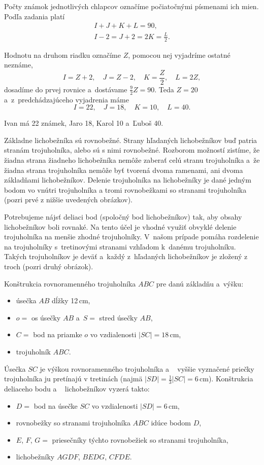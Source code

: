 {%
Počty známok jednotlivých chlapcov označíme počiatočnými písmenami ich mien.
Podľa zadania platí
$$
\begin{gathered}
	I+J+K+L=90, \\
	I-2 =J+2 =2K =\frac{L}2 .
\end{gathered}
$$

Hodnotu na druhom riadku označíme $Z$, pomocou nej vyjadríme ostatné neznáme,
$$
I=Z+2,\quad J=Z-2,\quad K=\frac{Z}2,\quad L=2Z,
$$
dosadíme do prvej rovnice a~dostávame $\frac92 Z=90$.
Teda $Z=20$ a~z~predchádzajúceho vyjadrenia máme
$$
I=22,\quad J=18,\quad K=10,\quad L=40.
$$

Ivan má 22 známek, Jaro 18, Karol 10 a~Ľuboš 40.
}

{%
Základne lichobežníka sú rovnobežné.
Strany hľadaných lichobežníkov buď patria stranám trojuholníka, alebo sú s nimi rovnobežné.
Rozborom možností zistíme, že žiadna strana žiadneho lichobežníka nemôže zaberať celú stranu trojuholníka a~že žiadna strana trojuholníka nemôže byť tvorená dvoma ramenami, ani dvoma základňami lichobežníkov.
Delenie trojuholníka na lichobežníky je dané jedným bodom vo vnútri trojuholníka a tromi rovnobežkami so stranami trojuholníka (pozri prvé z nižšie uvedených obrázkov).

Potrebujeme nájsť deliaci bod (spoločný bod lichobežníkov) tak, aby obsahy lichobežníkov boli rovnaké.
Na tento účel je vhodné využiť obvyklé delenie trojuholníka na menšie zhodné trojuholníky.
V~našom prípade pomáha rozdelenie na trojuholníky s~tretinovými stranami vzhľadom k~danému trojuholníku.
Takých trojuholníkov je deväť a~každý z~hľadaných lichobežníkov je zložený z troch (pozri druhý obrázok).
%

Konštrukcia rovnoramenného trojuholníka $ABC$ pre danú základňu a~výšku:
\begin{itemize}
  \item úsečka $AB$ dĺžky 12\,cm,
  \item $o =$ os úsečky $AB$ a~$S =$ stred úsečky $AB$,
  \item $C =$ bod na priamke $o$ vo vzdialenosti $|SC|=18$\,cm,
  \item trojuholník $ABC$.
\end{itemize}

Úsečka $SC$ je výškou rovnoramenného trojuholníka a ~ vyššie vyznačené priečky trojuholníka ju pretínajú v tretinách
(najmä $|SD|=\frac13|SC|=6$\,cm).
Konštrukcia deliaceho bodu a ~ lichobežníkov vyzerá takto:
\begin{itemize}
  \item $D =$ bod na úsečke $SC$ vo vzdialenosti $|SD|=6$\,cm,
  \item rovnobežky so stranami trojuholníka $ABC$ idúce bodom $D$,
  \item $E$, $F$, $G =$ priesečníky týchto rovnobežiek so stranami trojuholníka,
  \item lichobežníky $AGDF$, $BEDG$, $CFDE$.
\end{itemize}
~%

}
